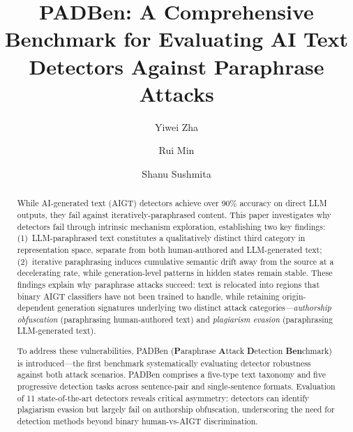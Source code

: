 \documentclass[runningheads]{llncs}
\begin{document}
\title{PADBen: A Comprehensive Benchmark for Evaluating AI Text Detectors Against Paraphrase Attacks}
%

\author{Yiwei Zha \and
Rui Min \and
Shanu Sushmita}

%

%
%
\maketitle
%
\begin{abstract}
While AI-generated text (AIGT) detectors achieve over 90\% accuracy on 
direct LLM outputs, they fail against iteratively-paraphrased content. 
This paper investigates why detectors fail through intrinsic mechanism exploration, 
establishing two key findings: (1)~LLM-paraphrased text constitutes a 
qualitatively distinct third category in representation space, separate 
from both human-authored and LLM-generated text; (2)~iterative 
paraphrasing induces cumulative semantic drift away from the source at 
a decelerating rate, while generation-level patterns in hidden states 
remain stable. These findings explain why paraphrase attacks succeed: 
text is relocated into regions that binary AIGT classifiers have not 
been trained to handle, while retaining origin-dependent generation 
signatures underlying two distinct attack categories---\textit{authorship 
obfuscation} (paraphrasing human-authored text) and \textit{plagiarism 
evasion} (paraphrasing LLM-generated text).

To address these vulnerabilities, PADBen (\textbf{P}araphrase 
\textbf{A}ttack \textbf{D}etection \textbf{Ben}chmark) is 
introduced---the first benchmark systematically evaluating detector 
robustness against both attack scenarios. PADBen comprises a five-type 
text taxonomy and five progressive detection tasks across sentence-pair 
and single-sentence formats. Evaluation of 11 state-of-the-art detectors 
reveals critical asymmetry: detectors can identify plagiarism evasion 
but largely fail on authorship obfuscation, underscoring the need for 
detection methods beyond binary human-vs-AIGT discrimination.

\end{abstract}
\end{document}
